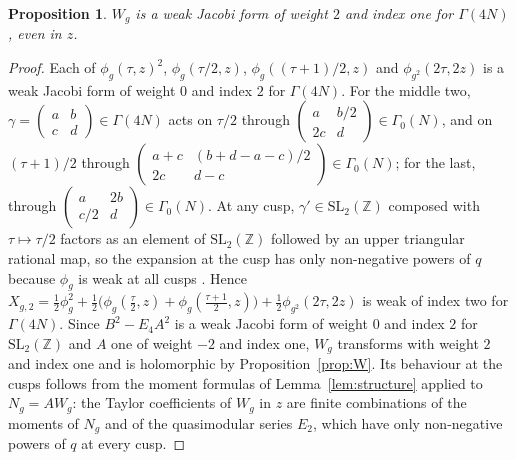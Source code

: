 \documentclass[11pt]{amsart}
\newtheorem{proposition}[theorem]{Proposition}
\theoremstyle{definition}
\newcommand{\ZZ}{\mathbb{Z}}
\begin{document}
\begin{proposition}\label{prop:Wweak}
$W_g$ is a weak Jacobi form of weight $2$ and index one for $\Gamma(4N)$, even in $z$.
\end{proposition}

\begin{proof}
Each of $\phi_g(\tau,z)^2$, $\phi_g(\tau/2,z)$, $\phi_g((\tau+1)/2,z)$ and $\phi_{g^2}(2\tau,2z)$ is a weak Jacobi form of weight $0$ and index $2$ for $\Gamma(4N)$. For the middle two, $\gamma=\left(\begin{smallmatrix}a&b\\c&d\end{smallmatrix}\right)\in\Gamma(4N)$ acts on $\tau/2$ through $\left(\begin{smallmatrix}a&b/2\\2c&d\end{smallmatrix}\right)\in\Gamma_0(N)$, and on $(\tau+1)/2$ through $\left(\begin{smallmatrix}a+c&(b+d-a-c)/2\\2c&d-c\end{smallmatrix}\right)\in\Gamma_0(N)$; for the last, through $\left(\begin{smallmatrix}a&2b\\c/2&d\end{smallmatrix}\right)\in\Gamma_0(N)$. At any cusp, $\gamma'\in\mathrm{SL}_2(\ZZ)$ composed with $\tau\mapsto\tau/2$ factors as an element of $\mathrm{SL}_2(\ZZ)$ followed by an upper triangular rational map, so the expansion at the cusp has only non-negative powers of $q$ because $\phi_g$ is weak at all cusps \cite{Che10,GHV10}. Hence $X_{g,2}=\frac12\phi_g^2+\frac12\bigl(\phi_g(\frac\tau2,z)+\phi_g(\frac{\tau+1}2,z)\bigr)+\frac12\phi_{g^2}(2\tau,2z)$ is weak of index two for $\Gamma(4N)$. Since $B^2-E_4A^2$ is a weak Jacobi form of weight $0$ and index $2$ for $\mathrm{SL}_2(\ZZ)$ and $A$ one of weight $-2$ and index one, $W_g$ transforms with weight $2$ and index one and is holomorphic by Proposition~\ref{prop:W}. Its behaviour at the cusps follows from the moment formulas of Lemma~\ref{lem:structure} applied to $N_g=AW_g$: the Taylor coefficients of $W_g$ in $z$ are finite combinations of the moments of $N_g$ and of the quasimodular series $E_2$, which have only non-negative powers of $q$ at every cusp.
\end{proof}
\end{document}
